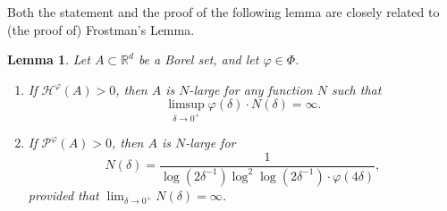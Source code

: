 \documentclass[12pt]{amsart}
\renewcommand{\phi}{\varphi}
\newtheorem{lemma}[theorem]{Lemma}
\def\R{{\mathbb{R}}}
\numberwithin{theorem}{section}
\numberwithin{equation}{section}
\begin{document}
Both the statement and the proof of the following lemma are closely related to (the proof of) Frostman's Lemma.
\begin{lemma} \label{lem:large-Hausdorff-packing}
    Let $A\subset\R^d$ be a Borel set, and let $\phi\in\Phi$.
    \begin{enumerate}[label=\textup{(\roman*)}]
        \item  \label{it:assumption-H} If $\mathcal{H}^\phi(A)>0$, then $A$ is $N$-large for any function $N$ such that
        \[
            \limsup_{\delta\to 0^+} \phi(\delta) \cdot N(\delta)=\infty.
        \]
        \item \label{it:assumption-P} If $\mathcal{P}^\phi(A)>0$, then $A$ is $N$-large for
        \[
            N(\delta) = \frac{1}{\log (2\delta^{-1})\log^2\log(2\delta^{-1})\cdot \phi(4\delta)},
        \]
        provided that $\lim_{\delta\to 0^+}N(\delta)=\infty$.
    \end{enumerate}
\end{lemma}
\end{document}
